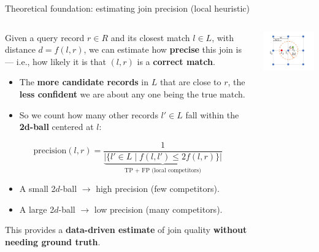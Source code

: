 \documentclass[8pt]{beamer} %
\begin{document}
\begin{frame}{Theoretical foundation: estimating join precision (local heuristic)}
	\begin{columns}
		\begin{column}{0.4\textwidth}
			Given a query record $r \in R$ and its closest match $l \in L$, with distance $d = f(l, r)$, we can estimate how \textbf{precise} this join is — i.e., how likely it is that $(l, r)$ is a \textbf{correct match}.
			

			\begin{itemize}
				\item The \textbf{more candidate records} in $L$ that are close to $r$, the \textbf{less confident} we are about any one being the true match.
				\item So we count how many other records $l' \in L$ fall within the \textbf{2d-ball} centered at $l$:
			\end{itemize}
			
			$$
			\text{precision}(l, r) =
			\frac{1}{
				\underbrace{|\{ l' \in L \mid f(l, l') \leq 2f(l, r) \}|}_{\text{TP + FP (local competitors)}}
			}
			$$
			
			\begin{itemize}
				\item A small 2$d$-ball $\rightarrow$ high precision (few competitors).
				\item A large 2$d$-ball $\rightarrow$ low precision (many competitors).
			\end{itemize}
			

			This provides a \textbf{data-driven estimate} of join quality \textbf{without needing ground truth}.
		\end{column}
		
		\begin{column}{0.4\textwidth}
			\centering
			\includegraphics[width=0.7\linewidth]{img/Pasted image 20250331211545.png}
			

\end{column}
\end{columns}
\end{frame}
\end{document}
